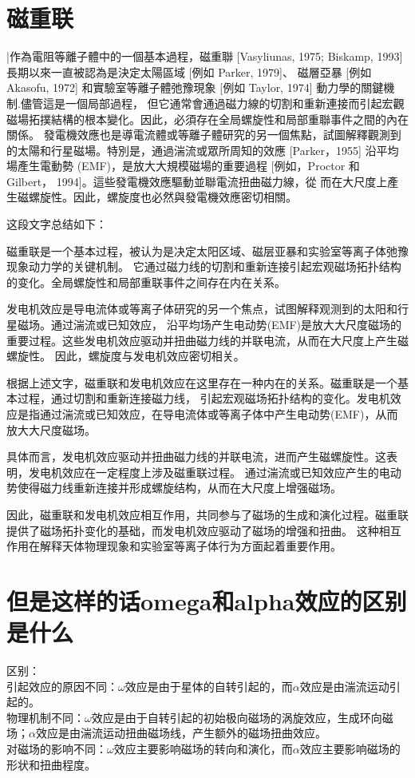 \documentclass[12pt, a4paper, oneside]{ctexart}
\begin{document}
\begin{spacing}{2.0}
\section{磁重联}
|作為電阻等離子體中的一個基本過程，磁重聯 [Vasyliunas, 1975; Biskamp, 1993] 長期以來一直被認為是決定太陽區域 [例如 Parker, 1979]、
磁層亞暴 [例如 Akasofu, 1972] 和實驗室等離子體弛豫現象 [例如 Taylor, 1974] 動力學的關鍵機制.儘管這是一個局部過程，
但它通常會通過磁力線的切割和重新連接而引起宏觀磁場拓撲結構的根本變化。因此，必須存在全局螺旋性和局部重聯事件之間的內在關係。
發電機效應也是導電流體或等離子體研究的另一個焦點，試圖解釋觀測到的太陽和行星磁場。特別是，通過湍流或眾所周知的效應 [Parker，1955] 
沿平均場產生電動勢 (EMF)，是放大大規模磁場的重要過程 [例如，Proctor 和 Gilbert， 1994]。這些發電機效應驅動並聯電流扭曲磁力線，從
而在大尺度上產生磁螺旋性。因此，螺旋度也必然與發電機效應密切相關。

这段文字总结如下：

磁重联是一个基本过程，被认为是决定太阳区域、磁层亚暴和实验室等离子体弛豫现象动力学的关键机制。
它通过磁力线的切割和重新连接引起宏观磁场拓扑结构的变化。全局螺旋性和局部重联事件之间存在内在关系。

发电机效应是导电流体或等离子体研究的另一个焦点，试图解释观测到的太阳和行星磁场。通过湍流或已知效应，
沿平均场产生电动势(EMF)是放大大尺度磁场的重要过程。这些发电机效应驱动并扭曲磁力线的并联电流，从而在大尺度上产生磁螺旋性。
因此，螺旋度与发电机效应密切相关。

根据上述文字，磁重联和发电机效应在这里存在一种内在的关系。磁重联是一个基本过程，通过切割和重新连接磁力线，
引起宏观磁场拓扑结构的变化。发电机效应是指通过湍流或已知效应，在导电流体或等离子体中产生电动势(EMF)，从而放大大尺度磁场。

具体而言，发电机效应驱动并扭曲磁力线的并联电流，进而产生磁螺旋性。这表明，发电机效应在一定程度上涉及磁重联过程。
通过湍流或已知效应产生的电动势使得磁力线重新连接并形成螺旋结构，从而在大尺度上增强磁场。

因此，磁重联和发电机效应相互作用，共同参与了磁场的生成和演化过程。磁重联提供了磁场拓扑变化的基础，而发电机效应驱动了磁场的增强和扭曲。
这种相互作用在解释天体物理现象和实验室等离子体行为方面起着重要作用。




\section{但是这样的话omega和alpha效应的区别是什么}
区别：
\\
引起效应的原因不同：$\omega$效应是由于星体的自转引起的，而$\alpha$效应是由湍流运动引起的。\\
物理机制不同：$\omega$效应是由于自转引起的初始极向磁场的涡旋效应，生成环向磁场；$\alpha$效应是由湍流运动扭曲磁场线，产生额外的磁场扭曲效应。\\
对磁场的影响不同：$\omega$效应主要影响磁场的转向和演化，而$\alpha$效应主要影响磁场的形状和扭曲程度。

\end{spacing}
\end{document}
